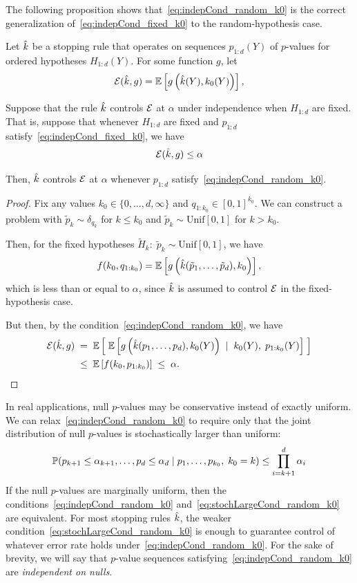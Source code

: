\documentclass{article}
\begin{document}
The following proposition shows that~\eqref{eq:indepCond_random_k0} is the correct generalization of~\eqref{eq:indepCond_fixed_k0} to the random-hypothesis case.
\begin{proposition}
  Let $\hk$ be a stopping rule that operates on sequences
  $p_{1:d}(Y)$ of $p$-values for ordered hypotheses $H_{1:d}(Y)$. 
  For some function $g$, let 
  \[
  \Err(\hk,g) = \E\left[ g\left(\hk(Y), k_0(Y)\right)\right],
  \]
  
  Suppose that the rule $\hk$ controls $\Err$ at $\alpha$ under
  independence when $H_{1:d}$ are fixed. That is, suppose that
  whenever $H_{1:d}$ are fixed and $p_{1:d}$
  satisfy~\eqref{eq:indepCond_fixed_k0}, we have
  \[
  \Err(\hk, g) \leq \alpha
  \]

  Then, $\hk$ controls $\Err$ at $\alpha$
  whenever $p_{1:d}$ satisfy~\eqref{eq:indepCond_random_k0}.
\end{proposition}
\begin{proof}
  Fix any values $k_0\in \{0,\ldots,d, \infty\}$ and $q_{1:k_0} \in [0,1]^{k_0}$. We can construct a problem with $\tilde p_k \sim \delta_{q_k}$ for $k\leq k_0$ and  $\tilde p_k \sim \text{Unif}[0,1]$ for $k > k_0$. 

  Then, for the fixed hypotheses 
  $\widetilde H_k:\; \tilde p_k \sim \text{Unif}[0,1]$, we have
  \[
  f(k_0, q_{1:k_0}) 
  = \E\left[ g\left(\hk(\tilde p_1, \ldots, \tilde p_d),
      k_0\right) \right],
  \]
  which is less than or equal to $\alpha$, since $\hk$ is assumed to control $\Err$ in the fixed-hypothesis case.

  But then, by the condition~\eqref{eq:indepCond_random_k0}, we have
  \begin{align}
    \Err(\hk,g) &\;=\; \E\left[ \;\E\left[ g\left(\hk(p_1,\ldots, p_d), k_0(Y)\right) \; \mid \; k_0(Y), \; p_{1:k_0}(Y)\right] \; \right]\\
    &\;\leq\; \E\left[f(k_0, p_{1:k_0})\right] \;\leq\; \alpha.
  \end{align}
\end{proof}

In real applications, null $p$-values may be conservative instead of exactly uniform. We can relax~\eqref{eq:indepCond_random_k0} to require only that the joint distribution of null $p$-values is stochastically larger than uniform:
\begin{equation}\label{eq:stochLargeCond_random_k0}
  \P(p_{k+1} \leq \alpha_{k+1}, \ldots, p_d \leq \alpha_d
  \mid p_1, \ldots, p_{k_0}, \; k_0 = k) \leq \prod_{i=k+1}^d \alpha_i
\end{equation}
If the null $p$-values are marginally uniform, then the conditions~\eqref{eq:indepCond_random_k0} and~\eqref{eq:stochLargeCond_random_k0} are equivalent. For most stopping rules $\hk$, the weaker condition~\eqref{eq:stochLargeCond_random_k0} is enough to guarantee control of whatever error rate holds under~\eqref{eq:indepCond_random_k0}. For the sake of brevity, we will say that $p$-value sequences satisfying~\eqref{eq:indepCond_random_k0} are {\em independent on nulls}.
\end{document}
